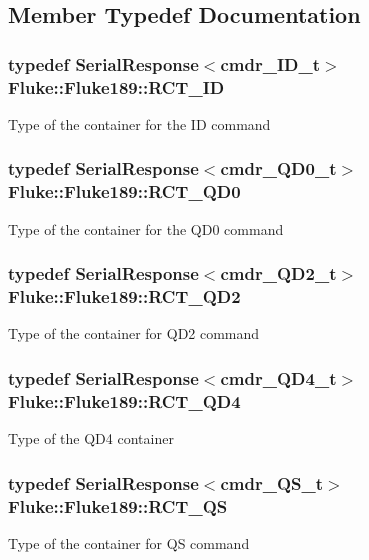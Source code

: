 \subsection{Member Typedef Documentation}
\hypertarget{classFluke_1_1Fluke189_a07788d6f33a7dd54b3a66373b5addded}{
\subsubsection[{RCT\_\-ID}]{\setlength{\rightskip}{0pt plus 5cm}typedef SerialResponse$<${\bf cmdr\_\-ID\_\-t}$>$ {\bf Fluke::Fluke189::RCT\_\-ID}}}
\label{classFluke_1_1Fluke189_a07788d6f33a7dd54b3a66373b5addded}
Type of the container for the ID command \hypertarget{classFluke_1_1Fluke189_a9a5b405bb506cd2482de2f8bb0bea189}{
\subsubsection[{RCT\_\-QD0}]{\setlength{\rightskip}{0pt plus 5cm}typedef SerialResponse$<${\bf cmdr\_\-QD0\_\-t}$>$ {\bf Fluke::Fluke189::RCT\_\-QD0}}}
\label{classFluke_1_1Fluke189_a9a5b405bb506cd2482de2f8bb0bea189}
Type of the container for the QD0 command \hypertarget{classFluke_1_1Fluke189_a6dcb8bdb7e09aba26dd95d49f56690cf}{
\subsubsection[{RCT\_\-QD2}]{\setlength{\rightskip}{0pt plus 5cm}typedef SerialResponse$<${\bf cmdr\_\-QD2\_\-t}$>$ {\bf Fluke::Fluke189::RCT\_\-QD2}}}
\label{classFluke_1_1Fluke189_a6dcb8bdb7e09aba26dd95d49f56690cf}
Type of the container for QD2 command \hypertarget{classFluke_1_1Fluke189_a82ebb2c4106833e320c8b18b968a5e22}{
\subsubsection[{RCT\_\-QD4}]{\setlength{\rightskip}{0pt plus 5cm}typedef SerialResponse$<${\bf cmdr\_\-QD4\_\-t}$>$ {\bf Fluke::Fluke189::RCT\_\-QD4}}}
\label{classFluke_1_1Fluke189_a82ebb2c4106833e320c8b18b968a5e22}
Type of the QD4 container \hypertarget{classFluke_1_1Fluke189_a9fee860a536aaaa113af0248791e9fef}{
\subsubsection[{RCT\_\-QS}]{\setlength{\rightskip}{0pt plus 5cm}typedef SerialResponse$<${\bf cmdr\_\-QS\_\-t}$>$ {\bf Fluke::Fluke189::RCT\_\-QS}}}
\label{classFluke_1_1Fluke189_a9fee860a536aaaa113af0248791e9fef}
Type of the container for QS command 

